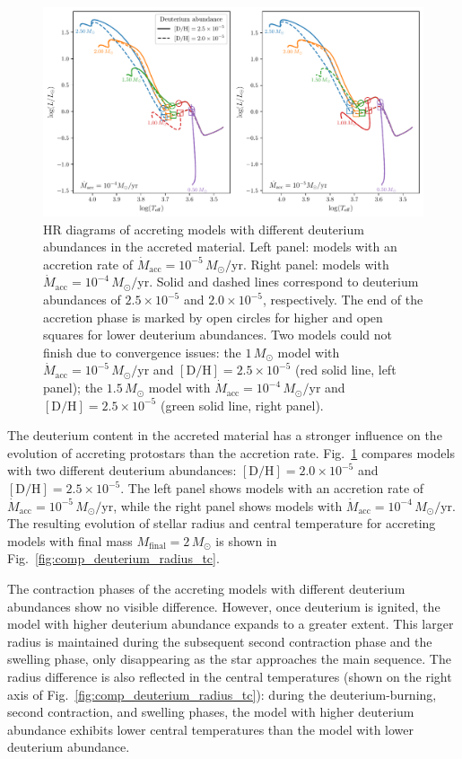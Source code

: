 \documentclass[12pt,a4paper]{article}
\newcommand{\mr}{\mathrm}
\begin{document}
\begin{figure}
  \centering
  \includegraphics[width=.98\textwidth,keepaspectratio]{cmp_deuterium.pdf}
  \caption{HR diagrams of accreting models with different deuterium abundances in the accreted material. Left panel: models with an accretion rate of $\dot{M}_\mr{acc} = 10^{-5}\,M_\odot/\mr{yr}$. Right panel: models with $\dot{M}_\mr{acc} = 10^{-4}\,M_\odot/\mr{yr}$. Solid and dashed lines correspond to deuterium abundances of $2.5 \times 10^{-5}$ and $2.0 \times 10^{-5}$, respectively. The end of the accretion phase is marked by open circles for higher and open squares for lower deuterium abundances. Two models could not finish due to convergence issues: the $1\,M_\odot$ model with $\dot{M}_\mr{acc} = 10^{-5}\,M_\odot/\mr{yr}$ and $[\mr{D/H}]=2.5\times10^{-5}$ (red solid line, left panel); the $1.5\,M_\odot$ model with $\dot{M}_\mr{acc} = 10^{-4}\,M_\odot/\mr{yr}$ and $[\mr{D/H}]=2.5\times10^{-5}$ (green solid line, right panel).} \label{fig:comp_deuterium} 
\end{figure}

The deuterium content in the accreted material has a stronger influence on the evolution of accreting protostars than the accretion rate. Fig.~\ref{fig:comp_deuterium} compares models with two different deuterium abundances: $[\mr{D/H}] = 2.0 \times 10^{-5}$ and $[\mr{D/H}] = 2.5 \times 10^{-5}$. The left panel shows models with an accretion rate of $\dot{M}_\mr{acc} = 10^{-5}\,M_\odot/\mr{yr}$, while the right panel shows models with $\dot{M}_\mr{acc} = 10^{-4}\,M_\odot/\mr{yr}$. The resulting evolution of stellar radius and central temperature for accreting models with final mass $M_\mr{final} = 2\,M_\odot$ is shown in Fig.~\ref{fig:comp_deuterium_radius_tc}.

The contraction phases of the accreting models with different deuterium abundances show no visible difference. However, once deuterium is ignited, the model with higher deuterium abundance expands to a greater extent. This larger radius is maintained during the subsequent second contraction phase and the swelling phase, only disappearing as the star approaches the main sequence. The radius difference is also reflected in the central temperatures (shown on the right axis of Fig.~\ref{fig:comp_deuterium_radius_tc}): during the deuterium-burning, second contraction, and swelling phases, the model with higher deuterium abundance exhibits lower central temperatures than the model with lower deuterium abundance.
\end{document}
